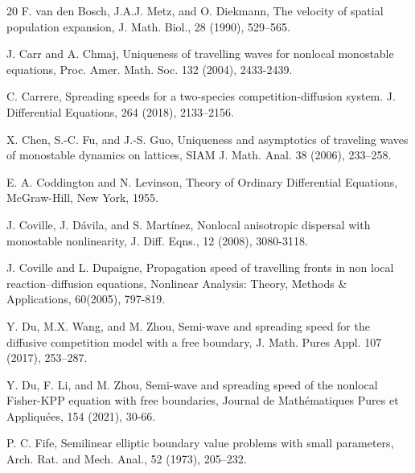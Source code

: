 \documentclass[11pt,a4paper]{article}
\numberwithin{equation}{section}
\numberwithin{figure}{section}
\begin{document}
\begin{thebibliography}{20}
{F. van den Bosch, J.A.J. Metz, and O. Diekmann},  
The velocity of spatial population expansion, J. Math. Biol., 28 (1990), 529–565.


{J. Carr and A. Chmaj},
Uniqueness of travelling waves for nonlocal monostable equations,
Proc. Amer. Math. Soc. 132 (2004), 2433-2439.


{C. Carrere}, Spreading speeds for a two-species competition-diffusion system. J. Differential Equations, 264
(2018), 2133--2156.

 {X. Chen, S.-C. Fu, and J.-S. Guo},
 Uniqueness and asymptotics of traveling waves of monostable dynamics on lattices, SIAM J. Math. Anal. 38 (2006), 233–258.

  {E. A. Coddington and N. Levinson}, Theory
of Ordinary Differential Equations, McGraw-Hill, New York, 1955.

{J. Coville, J. Dávila, and S. Martínez},
Nonlocal anisotropic dispersal with monostable nonlinearity,
J. Diff. Eqns.,
12 (2008), 3080-3118.

J. Coville and L. Dupaigne,
Propagation speed of travelling fronts in non local reaction–diffusion equations,
Nonlinear Analysis: Theory, Methods \& Applications, 60(2005), 797-819.

 {Y. Du, M.X. Wang, and M. Zhou}, Semi-wave and spreading speed for the diffusive competition model with a free boundary, J. Math. Pures Appl. 107 (2017), 253--287.

{Y. Du, F. Li, and  M. Zhou},
Semi-wave and spreading speed of the nonlocal Fisher-KPP equation with free boundaries,
Journal de Mathématiques Pures et Appliquées, 154 (2021), 30-66.






{P. C. Fife}, Semilinear elliptic boundary value problems with small parameters,
Arch. Rat. and Mech. Anal., 52 (1973), 205--232.


\end{thebibliography}
\end{document}
